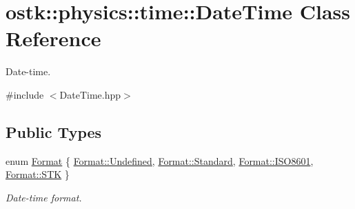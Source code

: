 \hypertarget{classostk_1_1physics_1_1time_1_1_date_time}{}\section{ostk\+:\+:physics\+:\+:time\+:\+:Date\+Time Class Reference}
\label{classostk_1_1physics_1_1time_1_1_date_time}


Date-\/time.  




{\ttfamily \#include $<$Date\+Time.\+hpp$>$}

\subsection*{Public Types}
\begin{DoxyCompactItemize}
\item 
enum \hyperlink{classostk_1_1physics_1_1time_1_1_date_time_a1d21d982b18bf56ed684fcf1cd97e092}{Format} \{ \hyperlink{classostk_1_1physics_1_1time_1_1_date_time_a1d21d982b18bf56ed684fcf1cd97e092aec0fc0100c4fc1ce4eea230c3dc10360}{Format\+::\+Undefined}, 
\hyperlink{classostk_1_1physics_1_1time_1_1_date_time_a1d21d982b18bf56ed684fcf1cd97e092aeb6d8ae6f20283755b339c0dc273988b}{Format\+::\+Standard}, 
\hyperlink{classostk_1_1physics_1_1time_1_1_date_time_a1d21d982b18bf56ed684fcf1cd97e092a35b6786739efcdc5a74ab1dca29d3b6b}{Format\+::\+I\+S\+O8601}, 
\hyperlink{classostk_1_1physics_1_1time_1_1_date_time_a1d21d982b18bf56ed684fcf1cd97e092a9c3581080a26f47bbe0746a2d9b7cf2c}{Format\+::\+S\+TK}
 \}\begin{DoxyCompactList}\small\item\em Date-\/time format. \end{DoxyCompactList}
\end{DoxyCompactItemize}
